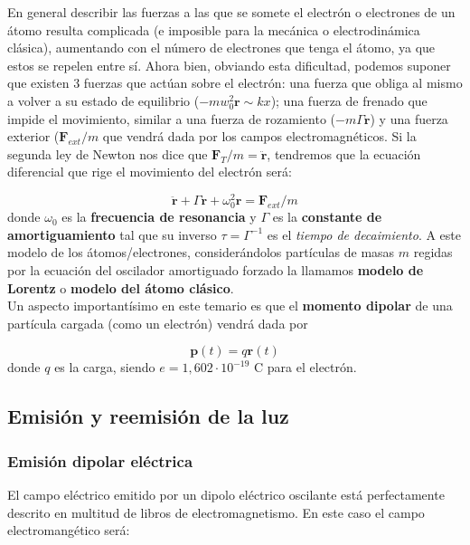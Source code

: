 \documentclass[12pt,a4paper]{article}
\newcommand{\Fn}{\mathbf{F}}
\newcommand{\rn}{\mathbf{r}}
\newcommand{\pn}{\mathbf{p}}
\numberwithin{equation}{section}
\numberwithin{figure}{section}
\begin{document}
En general describir las fuerzas a las que se somete el electrón o electrones de un átomo resulta complicada (e imposible para la mecánica o electrodinámica clásica), aumentando con el número de electrones que tenga el átomo, ya que estos se repelen entre sí. Ahora bien, obviando esta dificultad, podemos suponer que existen 3 fuerzas que actúan sobre el electrón: una fuerza que obliga al mismo a volver a su estado de equilibrio ($- m w^2_0 \rn \sim kx$); una fuerza de frenado que impide el movimiento, similar a una fuerza de rozamiento ($-m \Gamma \dot{\rn}$) y una fuerza exterior ($\Fn_{ext}/m$ que vendrá dada por los campos electromagnéticos. Si la segunda ley de Newton nos dice que $\Fn_T / m = \ddot{\rn}$, tendremos que la ecuación diferencial que rige el movimiento del electrón será:

\begin{equation}
\ddot{\rn} + \Gamma \dot{\rn} + \omega_0^2 \rn = \Fn_{ext}/m
\end{equation}
donde $\omega_0$ es la \textbf{frecuencia de resonancia} y $\Gamma$ es la \textbf{constante de amortiguamiento} tal que su inverso $\tau = \Gamma^{-1}$ es el \textit{tiempo de decaimiento}. A este modelo de los átomos/electrones, considerándolos partículas de masas $m$ regidas por la ecuación del oscilador amortiguado forzado la llamamos \textbf{modelo de Lorentz} o \textbf{modelo del átomo clásico}.\\

Un aspecto importantísimo en este temario es que el \textbf{momento dipolar} de una partícula cargada (como un electrón) vendrá dada por 

\begin{equation}
\pn (t) = q \rn (t) \label{Ec:7.1.0.02}
\end{equation}
donde $q$ es la carga, siendo $e=1,602 \cdot 10^{-19}$ C para el electrón.
 
\subsection{Emisión y reemisión de la luz}

\subsubsection{Emisión dipolar eléctrica} \label{Subsub:7.2.1}

El campo eléctrico emitido por un dipolo eléctrico oscilante está perfectamente descrito en multitud de libros de electromagnetismo. En este caso el campo electromangético será:
\end{document}
